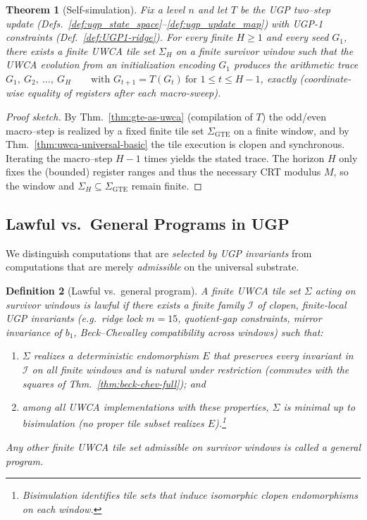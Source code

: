 \documentclass[12pt]{article}
\newtheorem{theorem}{Theorem}[section]
\newtheorem{definition}[theorem]{Definition}
\numberwithin{equation}{section}
\begin{document}
\begin{theorem}[Self-simulation]\label{thm:self-sim}
Fix a level $n$ and let $T$ be the UGP two–step update (Defs.~\ref{def:ugp_state_space}–\ref{def:ugp_update_map}) with UGP-1 constraints (Def.~\ref{def:UGP1-ridge}). For every finite $H\ge 1$ and every seed $G_1$, there exists a finite UWCA tile set $\Sigma_{H}$ on a finite survivor window such that the UWCA evolution from an initialization encoding $G_1$ produces the arithmetic trace
$G_1,\ G_2,\ \dots,\ G_{H}\qquad\text{with }G_{t+1}=T(G_t)\ \text{for }1\le t\le H-1$,
\emph{exactly} (coordinate-wise equality of registers after each macro-sweep).
\end{theorem}

\begin{proof}[Proof sketch]
By Thm.~\ref{thm:gte-as-uwca} (compilation of $T$) the odd/even macro–step is realized by a fixed finite tile set $\Sigma_{\mathrm{GTE}}$ on a finite window, and by Thm.~\ref{thm:uwca-universal-basic} the tile execution is clopen and synchronous. Iterating the macro–step $H-1$ times yields the stated trace. The horizon $H$ only fixes the (bounded) register ranges and thus the necessary CRT modulus $M$, so the window and $\Sigma_H\subseteq \Sigma_{\mathrm{GTE}}$ remain finite.
\end{proof}

\subsection{Lawful vs.\ General Programs in UGP}\label{subsec:lawful-general}

We distinguish computations that are \emph{selected by UGP invariants} from computations that are merely \emph{admissible} on the universal substrate.

\begin{definition}[Lawful vs.\ general program]\label{def:lawful-general}
A finite UWCA tile set $\Sigma$ acting on survivor windows is \emph{lawful} if there exists a finite family $\mathcal{I}$ of clopen, finite-local UGP invariants (e.g.\ ridge lock $m{=}15$, quotient-gap constraints, mirror invariance of $b_1$, Beck--Chevalley compatibility across windows) such that:
\begin{enumerate}[label=(\alph*), itemsep=2pt]
\item $\Sigma$ realizes a deterministic endomorphism $E$ that \emph{preserves} every invariant in $\mathcal{I}$ on all finite windows and is \emph{natural} under restriction (commutes with the squares of Thm.~\ref{thm:beck-chev-full}); and
\item among all UWCA implementations with these properties, $\Sigma$ is \emph{minimal} up to bisimulation (no proper tile subset realizes $E$).\footnote{Bisimulation identifies tile sets that induce isomorphic clopen endomorphisms on each window.}
\end{enumerate}
Any other finite UWCA tile set admissible on survivor windows is called a \emph{general} program.
\end{definition}
\end{document}
